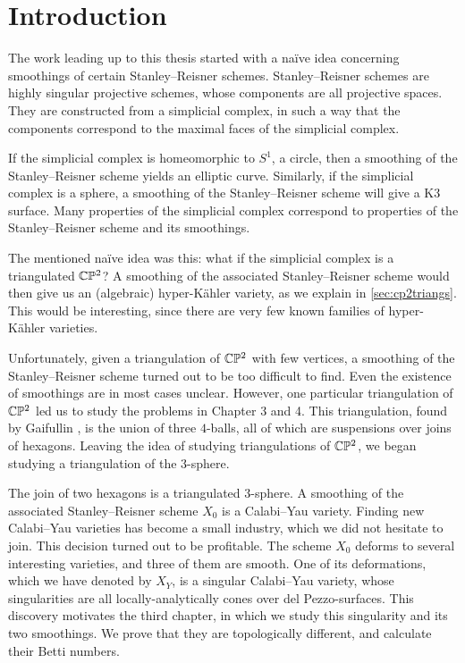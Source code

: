 \chapter{Introduction}
\label{sec:intro}

The work leading up to this thesis started with a naïve idea concerning smoothings of certain Stanley--Reisner schemes. Stanley--Reisner schemes are highly singular projective schemes, whose components are all projective spaces. They are constructed from a simplicial complex, in such a way that the components correspond to the maximal faces of the simplicial complex. 

If the simplicial complex is homeomorphic to $S^1$, a circle, then a smoothing of the Stanley--Reisner scheme yields an elliptic curve. Similarly, if the simplicial complex is a sphere, a smoothing of the Stanley--Reisner scheme will give a K3 surface. Many properties of the simplicial complex correspond to properties of the Stanley--Reisner scheme and its smoothings. 

The mentioned naïve idea was this: what if the simplicial complex is a triangulated $\mathbb{C} \mathbb{P}^2$? A smoothing of the associated Stanley--Reisner scheme would then give us an (algebraic) hyper-Kähler variety, as we explain in \cref{sec:cp2triangs}. This would be interesting, since there are very few known families of hyper-Kähler varieties.

Unfortunately, given a triangulation of $\mathbb{C} \mathbb{P}^2$ with few vertices, a smoothing of the Stanley--Reisner scheme turned out to be too difficult to find. Even the existence of smoothings are in most cases unclear. However, one particular triangulation of $\mathbb{C} \mathbb{P}^2$ led us to study the problems in Chapter 3 and 4. This triangulation, found by Gaifullin \cite{cp2_15_chess}, is the union of three $4$-balls, all of which are suspensions over joins of hexagons. Leaving the idea of studying triangulations of $\mathbb{C} \mathbb{P}^2$, we began studying a triangulation of the $3$-sphere.

The join of two hexagons is a triangulated $3$-sphere. A smoothing of the associated Stanley--Reisner scheme $X_0$ is a Calabi--Yau variety. Finding new Calabi--Yau varieties has become a small industry, which we did not hesitate to join. This decision turned out to be profitable. The scheme $X_0$ deforms to several interesting varieties, and three of them are smooth. One of its deformations, which we have denoted by $X_Y$, is a singular Calabi--Yau variety, whose singularities are all locally-analytically cones over del Pezzo-surfaces. This discovery motivates the third chapter, in which we study this singularity and its two smoothings. We prove that they are topologically different, and calculate their Betti numbers.

